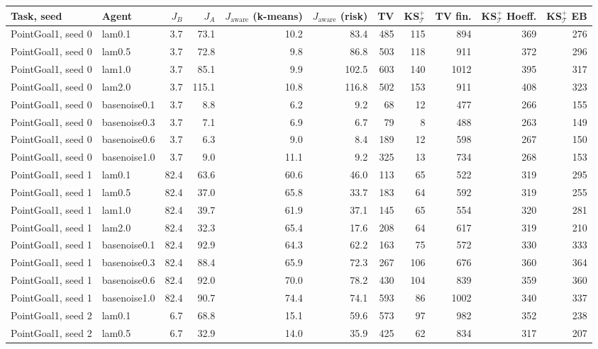 \begin{tabular}{llrrrrrrrrr}
\toprule
 Task, seed & Agent & $J_B$ & $J_A$ & $J_{\mathrm{aware}}$ (k-means) & $J_{\mathrm{aware}}$ (risk) & TV & KS$^+_{\mathcal T}$ & TV fin. & KS$^+_{\mathcal T}$ Hoeff. & KS$^+_{\mathcal T}$ EB \\
\midrule
PointGoal1, seed 0 & lam0.1 & 3.7 & 73.1 & 10.2 & 83.4 & 485 & 115 & 894 & 369 & 276 \\
PointGoal1, seed 0 & lam0.5 & 3.7 & 72.8 & 9.8 & 86.8 & 503 & 118 & 911 & 372 & 296 \\
PointGoal1, seed 0 & lam1.0 & 3.7 & 85.1 & 9.9 & 102.5 & 603 & 140 & 1012 & 395 & 317 \\
PointGoal1, seed 0 & lam2.0 & 3.7 & 115.1 & 10.8 & 116.8 & 502 & 153 & 911 & 408 & 323 \\
PointGoal1, seed 0 & basenoise0.1 & 3.7 & 8.8 & 6.2 & 9.2 & 68 & 12 & 477 & 266 & 155 \\
PointGoal1, seed 0 & basenoise0.3 & 3.7 & 7.1 & 6.9 & 6.7 & 79 & 8 & 488 & 263 & 149 \\
PointGoal1, seed 0 & basenoise0.6 & 3.7 & 6.3 & 9.0 & 8.4 & 189 & 12 & 598 & 267 & 150 \\
PointGoal1, seed 0 & basenoise1.0 & 3.7 & 9.0 & 11.1 & 9.2 & 325 & 13 & 734 & 268 & 153 \\
\midrule
PointGoal1, seed 1 & lam0.1 & 82.4 & 63.6 & 60.6 & 46.0 & 113 & 65 & 522 & 319 & 295 \\
PointGoal1, seed 1 & lam0.5 & 82.4 & 37.0 & 65.8 & 33.7 & 183 & 64 & 592 & 319 & 255 \\
PointGoal1, seed 1 & lam1.0 & 82.4 & 39.7 & 61.9 & 37.1 & 145 & 65 & 554 & 320 & 281 \\
PointGoal1, seed 1 & lam2.0 & 82.4 & 32.3 & 65.4 & 17.6 & 208 & 64 & 617 & 319 & 210 \\
PointGoal1, seed 1 & basenoise0.1 & 82.4 & 92.9 & 64.3 & 62.2 & 163 & 75 & 572 & 330 & 333 \\
PointGoal1, seed 1 & basenoise0.3 & 82.4 & 88.4 & 65.9 & 72.3 & 267 & 106 & 676 & 360 & 364 \\
PointGoal1, seed 1 & basenoise0.6 & 82.4 & 92.0 & 70.0 & 78.2 & 430 & 104 & 839 & 359 & 360 \\
PointGoal1, seed 1 & basenoise1.0 & 82.4 & 90.7 & 74.4 & 74.1 & 593 & 86 & 1002 & 340 & 337 \\
\midrule
PointGoal1, seed 2 & lam0.1 & 6.7 & 68.8 & 15.1 & 59.6 & 573 & 97 & 982 & 352 & 238 \\
PointGoal1, seed 2 & lam0.5 & 6.7 & 32.9 & 14.0 & 35.9 & 425 & 62 & 834 & 317 & 207 \\

\end{tabular}
